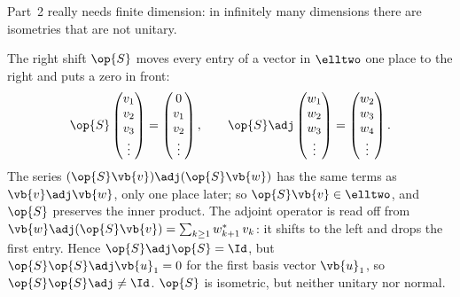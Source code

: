 Part~2 really needs finite dimension: in infinitely many dimensions there are isometries that
are not unitary.

\begin{vertiefung}[id=c03.v6,
    titel={Isometric but not unitary},
    wozu={In finite dimension every isometry is unitary
      (Proposition~\ref{c03.prop.isometrie}). Here is an isometry of $\elltwo$ that is not, and
      one sees at which step of the proof it fails.},
    voraussetzung={Proposition~\ref{c03.prop.isometrie}; Deeper blocks~\ref{c03.v1} and~\ref{c03.v4}
      (the example of a basis of $\elltwo$). The core up to Chapter~4 does not need this block.},
    zurueck={In infinitely many dimensions an operator can preserve the inner product without
      being unitary. Part~2 of Proposition~\ref{c03.prop.isometrie} holds only in finite
      dimension.}]
  \begin{example}\label{c03.ex.shift}
    The right shift $\op{S}$ moves every entry of a vector in $\elltwo$ one place to the right
    and puts a zero in front:
    \begin{equation}\label{c03.eq.shift}
      \op{S} \begin{pmatrix} v_1 \\ v_2 \\ v_3 \\ \vdots \end{pmatrix}
      = \begin{pmatrix} 0 \\ v_1 \\ v_2 \\ \vdots \end{pmatrix} ,
      \qquad
      \op{S}\adj \begin{pmatrix} w_1 \\ w_2 \\ w_3 \\ \vdots \end{pmatrix}
      = \begin{pmatrix} w_2 \\ w_3 \\ w_4 \\ \vdots \end{pmatrix} .
    \end{equation}
    The series $(\op{S}\vb{v})\adj(\op{S}\vb{w})$ has the same terms as $\vb{v}\adj\vb{w}$, only
    one place later; so $\op{S}\vb{v} \in \elltwo$, and $\op{S}$ preserves the inner product.
    The adjoint operator is read off from
    $\vb{w}\adj(\op{S}\vb{v}) = \sum_{k \geq 1} w_{k+1}^*\, v_k$: it shifts to the left and
    drops the first entry. Hence $\op{S}\adj\op{S} = \Id$, but
    $\op{S}\op{S}\adj \vb{u}_1 = 0$ for the first basis vector $\vb{u}_1$, so
    $\op{S}\op{S}\adj \neq \Id$. $\op{S}$ is isometric, but neither unitary nor normal.
  \end{example}


\end{vertiefung}
